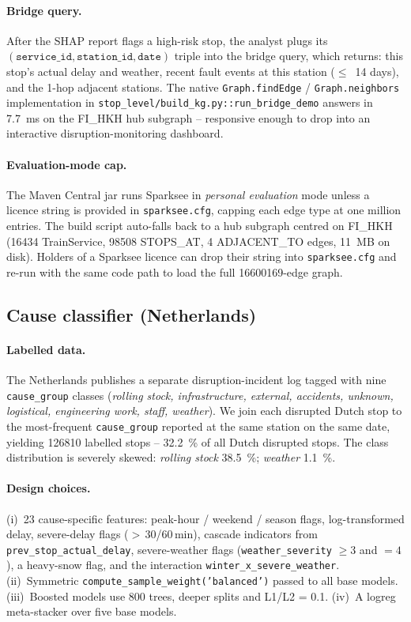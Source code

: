\paragraph{Bridge query.} After the SHAP report flags a high-risk stop, the analyst plugs its $(\texttt{service\_id}, \texttt{station\_id}, \texttt{date})$ triple into the bridge query, which returns: this stop's actual delay and weather, recent fault events at this station ($\leq$~14 days), and the 1-hop adjacent stations. The native \texttt{Graph.findEdge} / \texttt{Graph.neighbors} implementation in \texttt{stop\_level/build\_kg.py::run\_bridge\_demo} answers in \SI{7.7}{ms} on the FI\_HKH hub subgraph -- responsive enough to drop into an interactive disruption-monitoring dashboard.

\paragraph{Evaluation-mode cap.} The Maven Central jar runs Sparksee in \emph{personal evaluation} mode unless a licence string is provided in \texttt{sparksee.cfg}, capping each edge type at one million entries. The build script auto-falls back to a hub subgraph centred on FI\_HKH (\num{16434} TrainService, \num{98508} STOPS\_AT, \num{4} ADJACENT\_TO edges, \SI{11}{MB} on disk). Holders of a Sparksee licence can drop their string into \texttt{sparksee.cfg} and re-run with the same code path to load the full \num{16600169}-edge graph.

\subsection{Cause classifier (Netherlands)}

\paragraph{Labelled data.} The Netherlands publishes a separate disruption-incident log tagged with nine \texttt{cause\_group} classes (\emph{rolling stock, infrastructure, external, accidents, unknown, logistical, engineering work, staff, weather}). We join each disrupted Dutch stop to the most-frequent \texttt{cause\_group} reported at the same station on the same date, yielding \num{126810} labelled stops -- \SI{32.2}{\percent} of all Dutch disrupted stops. The class distribution is severely skewed: \emph{rolling stock} \SI{38.5}{\percent}; \emph{weather} \SI{1.1}{\percent}.

\paragraph{Design choices.} (i)~23 cause-specific features: peak-hour / weekend / season flags, log-transformed delay, severe-delay flags ($>$\,30/60\,min), cascade indicators from \texttt{prev\_stop\_actual\_delay}, severe-weather flags (\texttt{weather\_severity} $\geq 3$ and $=4$), a heavy-snow flag, and the interaction \texttt{winter\_x\_severe\_weather}. (ii)~Symmetric \texttt{compute\_sample\_weight('balanced')} passed to all base models. (iii)~Boosted models use 800 trees, deeper splits and L1/L2 = \num{0.1}. (iv)~A logreg meta-stacker over five base models.

